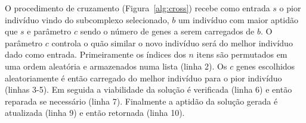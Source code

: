 O procedimento de cruzamento (Figura~\ref{alg:cross}) recebe como entrada
$s$ o pior indivíduo vindo do subcomplexo selecionado, $b$ um indivíduo com
maior aptidão que $s$ e parâmetro $c$ sendo o número de genes a serem carregados de $b$.
O parâmetro $c$ controla o quão similar o novo indivíduo será do melhor indivíduo
dado como entrada.
Primeiramente os índices dos $n$ itens são permutados em uma ordem aleatória e armazenados numa lista
(linha 2).
Os $c$ genes escolhidos aleatoriamente é então carregado do melhor indivíduo para
o pior indivíduo (linhas 3-5).
Em seguida a viabilidade da solução é verificada (linha 6) e então reparada
se necessário (linha 7).
Finalmente a aptidão da solução gerada é atualizada (linha 9) e então retornada (linha 10).
